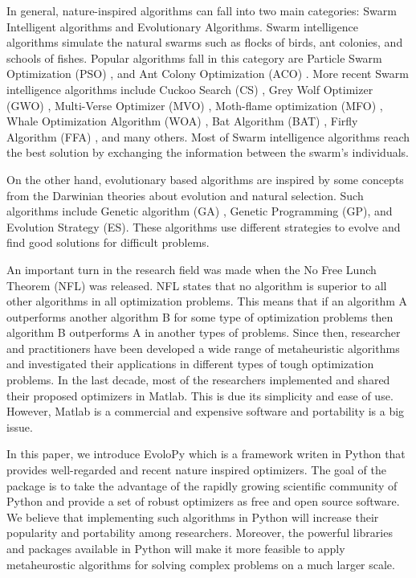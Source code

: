 \documentclass[a4paper,twoside]{article}
\begin{document}
In general, nature-inspired algorithms can fall into two main categories: Swarm Intelligent algorithms and Evolutionary Algorithms. Swarm intelligence algorithms simulate the natural swarms such as flocks of birds, ant colonies, and schools of fishes. Popular algorithms fall in this category are Particle Swarm Optimization (PSO) \cite{Kennedy95}, and Ant Colony Optimization (ACO) \cite{Koro_ec_2009}. More recent Swarm intelligence algorithms include Cuckoo Search (CS) \cite{Yang2009}, Grey Wolf Optimizer (GWO) \cite{Mirjalili201446}, Multi-Verse Optimizer (MVO) \cite{Mirjalili2016}, Moth-flame optimization (MFO) \cite{Mirjalili2015228}, Whale Optimization Algorithm (WOA) \cite{Mirjalili201651}, Bat Algorithm (BAT) \cite{Yang2010}, Firfly Algorithm (FFA) \cite{Yang2010FFA}, and many others. Most of Swarm intelligence algorithms reach the best solution by exchanging the information between the swarm's individuals. 

On the other hand, evolutionary based algorithms are inspired by some concepts from the Darwinian theories about evolution and natural selection. Such algorithms include Genetic algorithm (GA) \cite{Sivanandam}, Genetic Programming (GP)\cite{Koza1992}, and Evolution Strategy (ES)\cite{Beyer2002}. These algorithms use different strategies to evolve and find good solutions for difficult problems. 

An important turn in the research field was made when the No Free Lunch Theorem (NFL) was released. NFL states that no algorithm is superior to all other algorithms in all optimization problems. This means that if an algorithm A outperforms another algorithm B for some type of optimization problems then algorithm B outperforms A in another types of problems. Since then, researcher and practitioners have been developed a wide range of metaheuristic algorithms and investigated their applications in different types of tough optimization problems. In the last decade, most of the researchers implemented and shared their proposed optimizers in Matlab. This is due its simplicity and ease of use. However, Matlab is a commercial and expensive software and portability is a big issue.

In this paper, we introduce EvoloPy which is a framework writen in Python that provides well-regarded and recent nature inspired optimizers. The goal of the package is to take the advantage of the rapidly growing scientific community of Python and provide a set of robust optimizers as free and open source software. We believe that implementing such algorithms in Python will increase their popularity and portability among researchers. Moreover, the powerful libraries and packages available in Python will make it more feasible to apply metaheurostic algorithms for solving complex problems on a much larger scale.
\end{document}
